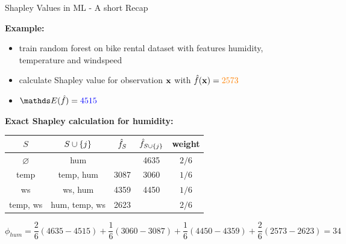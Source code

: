 \documentclass[11pt,compress,t,notes=noshow, aspectratio=169, xcolor=table]{beamer}
\begin{document}
\begin{frame}{Shapley Values in ML - A short Recap}
  
  \textbf{Example:} 
  \begin{itemize}
      \item train random forest on bike rental dataset with features humidity, temperature and windspeed
      \item calculate Shapley value for observation $\xv$ with $\fh(\xv) = \color{orange}{2573}$
      \item $\E(\fh) = \color{blue}{4515}$
  \end{itemize}
  \textbf{Exact Shapley calculation for humidity:} 
  \begin{table}[T]
      \centering
      \begin{tabular}{c|c|c|c|c}
   $S$    &  $\Scupj$  & $\fh_S$ &  $\fh_{\Scupj}$  & weight\\\hline
     $\varnothing$&    hum  & \color{blue}{4515} & 4635 & $2/6$\\
       temp &  temp, hum & 3087 & 3060& $1/6$\\
       ws &  ws, hum & 4359  & 4450 & $1/6$\\
       temp, ws &  hum, temp, ws & 2623 & \color{orange}{2573} & $2/6$
         
      \end{tabular}
      \label{tab:my_label}
  \end{table}

$$
\phi_{hum} = \frac{2}{6} (4635-4515) + \frac{1}{6} (3060-3087) + \frac{1}{6} (4450-4359) + \frac{2}{6} (2573-2623) = 34
$$

\end{frame}
\end{document}
